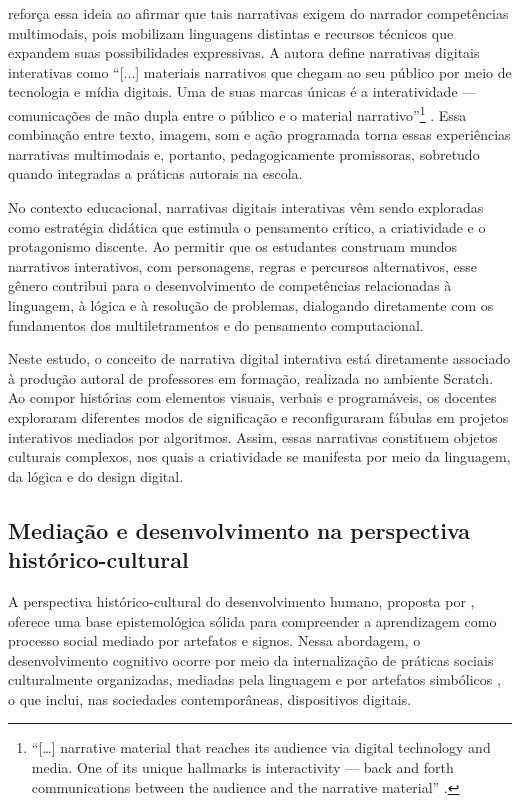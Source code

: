 \documentclass[portuguese]{textolivre}
\begin{document}
\textcite{miller2004} reforça essa ideia ao afirmar que tais narrativas exigem do narrador competências multimodais, pois mobilizam linguagens distintas e recursos técnicos que expandem suas possibilidades expressivas. A autora define narrativas digitais interativas como ``[...] materiais narrativos que chegam ao seu público por meio de tecnologia e mídia digitais. Uma de suas marcas únicas é a interatividade — comunicações de mão dupla entre o público e o material narrativo''\footnote{“[\ldots] narrative material that reaches its audience via digital technology and media. One of its unique hallmarks is interactivity — back and forth communications between the audience and the narrative material” \cite[p.~4]{miller2004}.} \cite[p.~4]{miller2004}. Essa combinação entre texto, imagem, som e ação programada torna essas experiências narrativas multimodais e, portanto, pedagogicamente promissoras, sobretudo quando integradas a práticas autorais na escola.

No contexto educacional, narrativas digitais interativas vêm sendo exploradas como estratégia didática que estimula o pensamento crítico, a criatividade e o protagonismo discente. Ao permitir que os estudantes construam mundos narrativos interativos, com personagens, regras e percursos alternativos, esse gênero contribui para o desenvolvimento de competências relacionadas à linguagem, à lógica e à resolução de problemas, dialogando diretamente com os fundamentos dos multiletramentos e do pensamento computacional.

Neste estudo, o conceito de narrativa digital interativa está diretamente associado à produção autoral de professores em formação, realizada no ambiente Scratch. Ao compor histórias com elementos visuais, verbais e programáveis, os docentes exploraram diferentes modos de significação e reconfiguraram fábulas em projetos interativos mediados por algoritmos. Assim, essas narrativas constituem objetos culturais complexos, nos quais a criatividade se manifesta por meio da linguagem, da lógica e do design digital.

\subsection{Mediação e desenvolvimento na perspectiva histórico-cultural}

A perspectiva histórico-cultural do desenvolvimento humano, proposta por \textcite{vygotsky2007}, oferece uma base epistemológica sólida para compreender a aprendizagem como processo social mediado por artefatos e signos. Nessa abordagem, o desenvolvimento cognitivo ocorre por meio da internalização de práticas sociais culturalmente organizadas, mediadas pela linguagem e por artefatos simbólicos \cite{vygotsky2007}, o que inclui, nas sociedades contemporâneas, dispositivos digitais.
\end{document}
